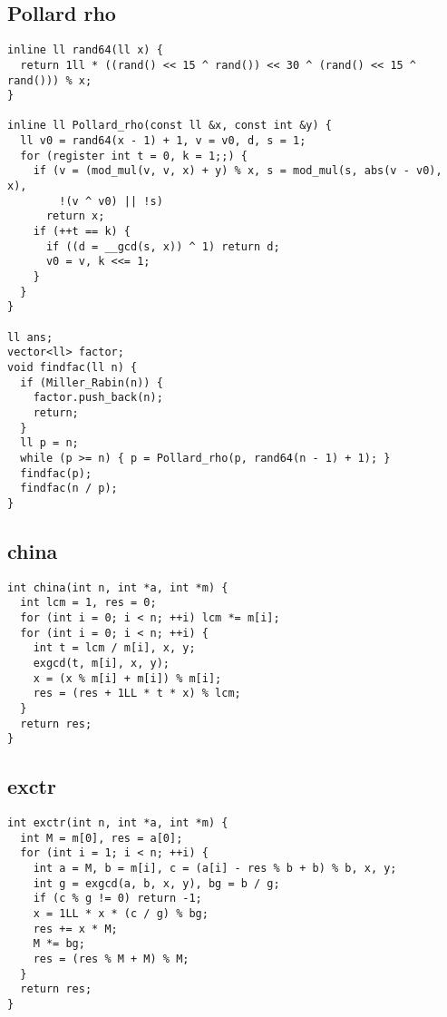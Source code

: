 \documentclass[twoside]{article}
\begin{document}
\subsection{Pollard rho}
\begin{lstlisting}
inline ll rand64(ll x) {
  return 1ll * ((rand() << 15 ^ rand()) << 30 ^ (rand() << 15 ^ rand())) % x;
}

inline ll Pollard_rho(const ll &x, const int &y) {
  ll v0 = rand64(x - 1) + 1, v = v0, d, s = 1;
  for (register int t = 0, k = 1;;) {
    if (v = (mod_mul(v, v, x) + y) % x, s = mod_mul(s, abs(v - v0), x),
        !(v ^ v0) || !s)
      return x;
    if (++t == k) {
      if ((d = __gcd(s, x)) ^ 1) return d;
      v0 = v, k <<= 1;
    }
  }
}

ll ans;
vector<ll> factor;
void findfac(ll n) {
  if (Miller_Rabin(n)) {
    factor.push_back(n);
    return;
  }
  ll p = n;
  while (p >= n) { p = Pollard_rho(p, rand64(n - 1) + 1); }
  findfac(p);
  findfac(n / p);
}

\end{lstlisting}
\subsection{china}
\begin{lstlisting}
int china(int n, int *a, int *m) {
  int lcm = 1, res = 0;
  for (int i = 0; i < n; ++i) lcm *= m[i];
  for (int i = 0; i < n; ++i) {
    int t = lcm / m[i], x, y;
    exgcd(t, m[i], x, y);
    x = (x % m[i] + m[i]) % m[i];
    res = (res + 1LL * t * x) % lcm;
  }
  return res;
}

\end{lstlisting}
\subsection{exctr}
\begin{lstlisting}
int exctr(int n, int *a, int *m) {
  int M = m[0], res = a[0];
  for (int i = 1; i < n; ++i) {
    int a = M, b = m[i], c = (a[i] - res % b + b) % b, x, y;
    int g = exgcd(a, b, x, y), bg = b / g;
    if (c % g != 0) return -1;
    x = 1LL * x * (c / g) % bg;
    res += x * M;
    M *= bg;
    res = (res % M + M) % M;
  }
  return res;
}

\end{lstlisting}
\end{document}
